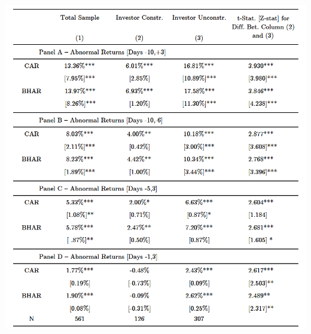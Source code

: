 \documentclass[12pt]{article}
\begin{document}
\begin{table}[!htbp]
\begin{adjustbox}{width=\textwidth}
		\includegraphics{ar_window_final}
	\end{adjustbox}\par\medskip
\end{table}
\end{document}
